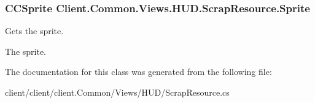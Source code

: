 \subsubsection[{Sprite}]{\setlength{\rightskip}{0pt plus 5cm}C\+C\+Sprite Client.\+Common.\+Views.\+H\+U\+D.\+Scrap\+Resource.\+Sprite\hspace{0.3cm}{\ttfamily [get]}}\label{classClient_1_1Common_1_1Views_1_1HUD_1_1ScrapResource_ac3135280912a00edcf479fcd8ecebaaf}


Gets the sprite. 

The sprite.

The documentation for this class was generated from the following file\+:\begin{DoxyCompactItemize}
\item 
client/client/client.\+Common/\+Views/\+H\+U\+D/Scrap\+Resource.\+cs\end{DoxyCompactItemize}
